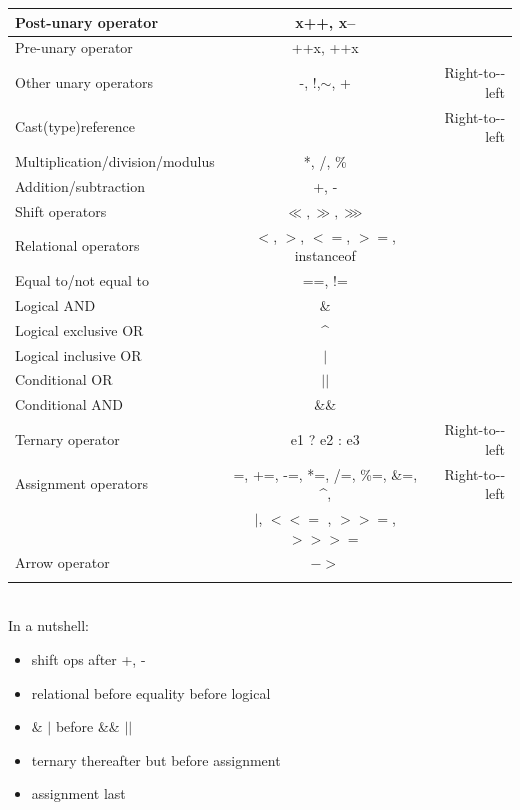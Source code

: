 \documentclass{scrartcl}
\begin{document}
    \begin{tabular}{|l|c|r|}
        \hline
        Post-­unary operator& x++, x-- &  \\
        \hline
        Pre-­unary operator& ++x, ++x &  \\
        \hline
        Other unary operators& -­, !,$\sim$, + &  Right-­to-­left \\
        \hline
        Cast(type)reference&  &  Right-­to-­left \\
        \hline
        Multiplication/division/modulus& *, /, \% &  \\
        \hline
        Addition/subtraction& +, - &  \\
        \hline
        Shift operators& $\ll, \gg, \ggg$ &  \\
        \hline
        Relational operators & $<$, $>$, $<=$, $>=$, instanceof & \\
        \hline
        Equal to/not equal to& ==, != &\\
        \hline
        Logical AND& \& &  \\
        \hline
        Logical exclusive OR& \textasciicircum \\
        \hline
        Logical inclusive OR& $|$ &  \\
        \hline
        Conditional OR& $||$ &  \\
        \hline
        Conditional AND& \&\& &  \\
        \hline
        Ternary operator& e1 ? e2 : e3 & Right-­to-­left\\
        \hline
        Assignment operators& =, +=, -­=, *=, /=, \%=, \&=, \textasciicircum, & Right-­to-­left\\
        & $|$, $<<=$ , $>>=$, $>>>=$ & \\
        \hline
        Arrow operator& $->$ &  \\\\
        \hline
    \end{tabular}
     \\

    In a nutshell:

    \begin{itemize}
        \item shift ops after +, -
        \item relational before equality before logical
        \item \& $|$ before \&\& $||$
        \item ternary thereafter but before assignment
        \item assignment last
    \end{itemize}
\end{document}
